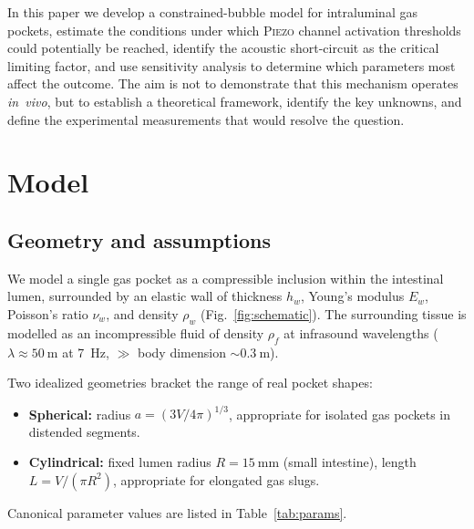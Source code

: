 \documentclass[12pt]{article}
\newcommand{\piezo}{\textsc{Piezo}}
\begin{document}
In this paper we develop a constrained-bubble model for intraluminal gas
pockets, estimate the conditions under which \piezo{} channel activation
thresholds could potentially be reached, identify the acoustic
short-circuit as the critical limiting factor, and use sensitivity analysis
to determine which parameters most affect the outcome.  The aim is not to
demonstrate that this mechanism operates \emph{in~vivo}, but to establish a
theoretical framework, identify the key unknowns, and define the
experimental measurements that would resolve the question.


\section{Model}
\label{sec:model}

\subsection{Geometry and assumptions}
\label{sec:geometry}

We model a single gas pocket as a compressible inclusion within the
intestinal lumen, surrounded by an elastic wall of thickness $h_w$,
Young's modulus $E_w$, Poisson's ratio $\nu_w$, and density $\rho_w$
(Fig.~\ref{fig:schematic}).  The surrounding tissue is modelled as an
incompressible fluid of density $\rho_f$ at infrasound wavelengths
($\lambda \approx \SI{50}{\metre}$ at \SI{7}{\hertz}, $\gg$
body dimension ${\sim}\SI{0.3}{\metre}$).

Two idealized geometries bracket the range of real pocket shapes:
\begin{itemize}
  \item \textbf{Spherical:} radius
        $a = (3V/4\pi)^{1/3}$, appropriate for isolated gas pockets in
        distended segments.
  \item \textbf{Cylindrical:} fixed lumen radius
        $R = \SI{15}{\milli\metre}$ (small intestine), length
        $L = V/(\pi R^2)$, appropriate for elongated gas slugs.
\end{itemize}

Canonical parameter values are listed in Table~\ref{tab:params}.
\end{document}
